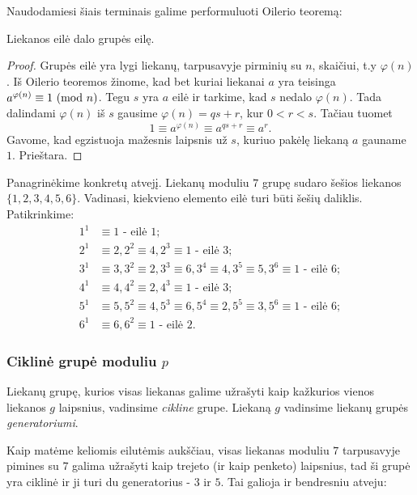 \noindent Naudodamiesi šiais terminais galime performuluoti Oilerio teoremą:

\begin{thm}
  Liekanos eilė dalo grupės eilę.
\end{thm}

\begin{proof} 
  Grupės eilė yra lygi liekanų, tarpusavyje pirminių su $n$, skaičiui, t.y
  $\varphi(n)$. Iš Oilerio teoremos žinome, kad bet kuriai liekanai $a$ yra
  teisinga $a^{\varphi(n)}\equiv 1 \ (\text{mod } n)$. Tegu $s$ yra $a$ eilė ir
  tarkime, kad $s$ nedalo $\varphi(n)$. Tada dalindami $\varphi(n)$ iš $s$
  gausime $\varphi(n) = qs + r$, kur $0< r < s$. Tačiau tuomet 
  $$1\equiv a^{\varphi(n)} \equiv a^{qs + r} \equiv a^r.$$ 
  Gavome, kad egzistuoja mažesnis laipsnis už $s$, kuriuo pakėlę liekaną $a$
  gauname $1$. Prieštara.
\end{proof}

Panagrinėkime konkretų atvejį. Liekanų moduliu $7$ grupę sudaro šešios
liekanos $\{1, 2, 3, 4, 5, 6\}$. Vadinasi, kiekvieno elemento eilė turi būti
šešių daliklis. Patikrinkime:
\begin{align*}
  1^1 & \equiv 1 \text{ - eilė } 1; \\
  2^1 & \equiv 2, 2^2 \equiv 4, 2^3 \equiv 1 \text{ - eilė } 3; \\
  3^1 & \equiv 3, 3^2 \equiv 2, 3^3 \equiv 6, 3^4 \equiv 4, 3^5 \equiv 5,
  3^6 \equiv 1 \text{ - eilė } 6; \\
  4^1 & \equiv 4, 4^2 \equiv 2, 4^3 \equiv 1 \text{ - eilė } 3; \\
  5^1 & \equiv 5, 5^2 \equiv 4, 5^3 \equiv 6, 5^4 \equiv 2, 5^5 \equiv 3, 5^6
  \equiv 1 \text{ - eilė } 6;\\
  6^1 & \equiv 6, 6^2 \equiv 1 \text{ - eilė } 2.
\end{align*}

\subsubsection{Ciklinė grupė moduliu $p$}

\begin{api}
  Liekanų grupę, kurios visas liekanas galime užrašyti kaip kažkurios
  vienos liekanos $g$ laipsnius, vadinsime \emph{cikline} grupe. Liekaną
  $g$ vadinsime liekanų grupės \emph{generatoriumi}.
\end{api}

Kaip matėme keliomis eilutėmis aukščiau, visas liekanas moduliu $7$ tarpusavyje pimines su $7$ galima
užrašyti kaip trejeto (ir kaip penketo) laipsnius, tad ši grupė yra ciklinė
ir ji turi du generatorius - $3$ ir $5$. Tai galioja ir bendresniu atveju:

